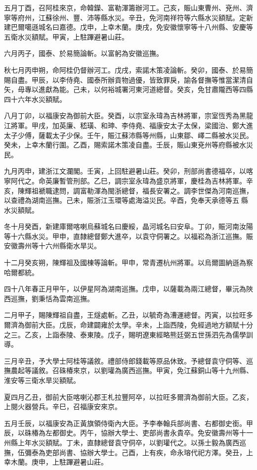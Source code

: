 \begin{pinyinscope}
五月丁酉，召阿桂來京，命韓鑅、富勒渾籌辦河工。己亥，賑山東曹州、兗州、濟寧等府州，江蘇徐州、豐、沛等縣水災。辛丑，免河南祥符等六縣水災額賦。定新建巴爾噶遜城名曰嘉德。戊申，上幸木蘭。庚戌，免安徽懷寧等十八州縣、安慶等五衛水災額賦。甲寅，上駐蹕避暑山莊。

六月丙子，國泰、於易簡論斬。以富躬為安徽巡撫。

秋七月丙申朔，命阿桂仍督辦河工。戊戌，索諾木策凌論斬。癸卯，國泰、於易簡賜自盡。甲辰，以李侍堯、國泰所辦貢物過優，皆致罪戾，諭各督撫等惟當潔清自矢，毋專以進獻為能。己未，以何裕城署河東河道總督。癸亥，免甘肅隴西等四縣四十六年水災額賦。

八月丁卯，以福康安為御前大臣。癸酉，以宗室永瑋為吉林將軍，宗室恆秀為黑龍江將軍。甲戌，加英廉、嵇璜、和珅、李侍堯、福康安太子太保，梁國治、鄭大進太子少傅，薩載太子少保。壬午，賑江蘇沛縣等州縣，山東鄒、嶧二縣被水災民。癸未，上幸木蘭行圍。乙酉，賜索諾木策凌自盡。壬辰，賑山東兗州等府縣被水災民。

九月丙申，建浙江文瀾閣。壬寅，上回駐避暑山莊。癸卯，刑部尚書德福卒，以喀寧阿代之。命英廉暫管刑部。乙巳，調宗室永瑋為盛京將軍，慶桂為吉林將軍。辛亥，陳輝祖褫職逮問，調富勒渾為閩浙總督，福長安署之。調李世傑為河南巡撫，以查禮為湖南巡撫。己未，賑浙江玉環等處海溢災民。辛酉，免奉天承德等五縣水災額賦。

冬十月癸酉，新建庫爾喀喇烏蘇城名曰慶綏，晶河城名曰安阜。丁卯，賑河南汝陽等十六縣水災。甲申，直隸總督鄭大進卒，以袁守侗署之。以福崧為浙江巡撫。賑安徽壽州等十六州縣衛水旱災。

十二月癸亥朔，陳輝祖及國棟等論斬。甲申，常青遷杭州將軍。以烏爾圖納遜為察哈爾都統。

四十八年春正月甲午，以伊星阿為湖南巡撫。戊申，以薩載為兩江總督，畢沅為陜西巡撫，劉秉恬為雲南巡撫。

二月甲子，賜陳輝祖自盡，王燧處斬。乙丑，以毓奇為漕運總督。丙寅，以拉旺多爾濟為御前大臣。戊辰，命建闢雍於太學。辛未，上詣西陵，免經過地方額賦十分之三。乙亥，上詣泰陵、泰東陵。戊子，賜明遼東經略熊廷弼五世孫泗先為儒學訓導。

三月辛丑，予大學士阿桂等議敘。禮部侍郎錢載等原品休致。予總督袁守侗等、巡撫農起等議敘。召硃椿來京，以劉瓘為廣西巡撫。甲寅，免江蘇銅山等十九州縣、淮安等三衛水旱災額賦。

夏四月乙丑，御前大臣喀喇沁郡王札拉豐阿卒，以拉旺多爾濟為御前大臣。乙亥，上閱火器營兵。辛巳，召福康安來京。

五月壬辰，以福康安為正黃旗領侍衛內大臣。予李奉翰兵部尚書、右都御史銜。甲辰，以硃椿為左都御史。丙午，協辦大學士、吏部尚書永貴卒。免安徽壽州等十一州縣上年水災額賦。丁未，直隸總督袁守侗卒，以劉瓘代之。以孫士毅為廣西巡撫，伍彌泰為吏部尚書、協辦大學士。己酉，上有疾，命永瑢代祀方澤。癸丑，上幸木蘭。庚申，上駐蹕避暑山莊。


\end{pinyinscope}

